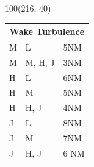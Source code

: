 \documentclass[10pt,landscape,a4paper]{article}
\begin{document}
\begin{textblock}{100}(216, 40)
\begin{table}[]
\begin{tabular}{|l|l|l|}
\multicolumn{3}{c}{\textbf{Wake Turbulence}} \\ \hline
 M  & L  & 5NM   \\ \hline
 M  & M, H, J  & 3NM   \\ \hline
 H  & L & 6NM   \\ \hline
 H  & M & 5NM   \\ \hline
 H  & H, J & 4NM \\ \hline
 J &  L & 8NM \\ \hline
 J &  M & 7NM \\ \hline
 J &  H, J  & 6 NM   \\ \hline
\end{tabular}
\end{table}
\end{textblock}
\end{document}
